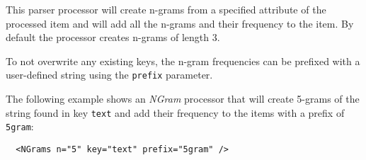 
This parser processor will create n-grams from a specified attribute of
the processed item and will add all the n-grams and their frequency to
the item. By default the processor creates n-grams of length 3.

To not overwrite any existing keys, the n-gram frequencies can be
prefixed with a user-defined string using the \texttt{prefix} parameter.

The following example shows an \emph{NGram} processor that will create
5-grams of the string found in key \texttt{text} and add their frequency
to the items with a prefix of \texttt{5gram}:

\begin{verbatim}
  <NGrams n="5" key="text" prefix="5gram" />
\end{verbatim}


\begin{table}[h]
\end{table}
